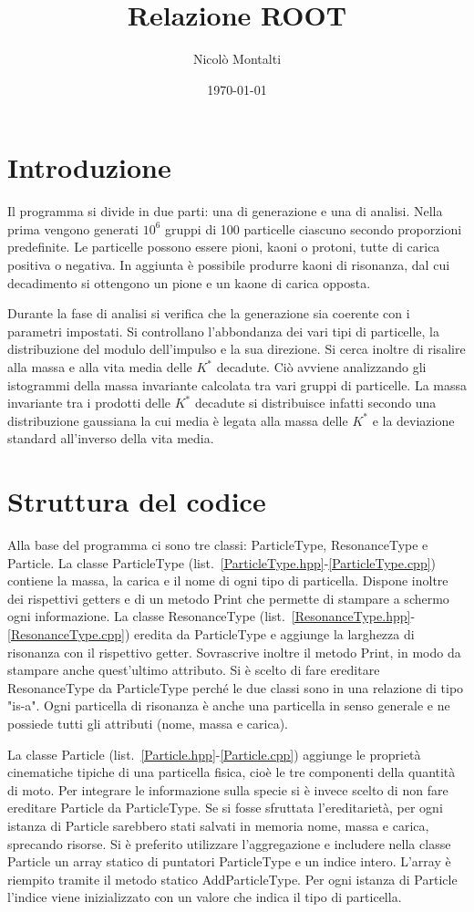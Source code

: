 \documentclass[a4paper,10pt]{article}
\title{Relazione ROOT}
\author{Nicolò Montalti}
\date{\today}
\begin{document}
\maketitle
\section{Introduzione}
Il programma si divide in due parti: una di generazione e una di analisi. Nella prima vengono generati $10^6$ gruppi di 100 particelle ciascuno secondo proporzioni predefinite. Le particelle possono essere pioni, kaoni o protoni, tutte di carica positiva o negativa. In aggiunta è possibile produrre kaoni di risonanza, dal cui decadimento si ottengono un pione e un kaone di carica opposta.

Durante la fase di analisi si verifica che la generazione sia coerente con i parametri impostati. Si controllano l'abbondanza dei vari tipi di particelle, la distribuzione del modulo dell'impulso e la sua direzione. Si cerca inoltre di risalire alla massa e alla vita media delle $K^*$ decadute. Ciò avviene analizzando gli istogrammi della massa invariante calcolata tra vari gruppi di particelle. La massa invariante tra i prodotti delle $K^*$ decadute si distribuisce infatti secondo una distribuzione gaussiana la cui media è legata alla massa delle $K^*$ e la deviazione standard all'inverso della vita media.

\section{Struttura del codice}
Alla base del programma ci sono tre classi: ParticleType, ResonanceType e Particle. La classe ParticleType (list.~\ref{ParticleType.hpp}-\ref{ParticleType.cpp}) contiene la massa, la carica e il nome di ogni tipo di particella. Dispone inoltre dei rispettivi getters e di un metodo Print che permette di stampare a schermo ogni informazione. La classe ResonanceType (list.~\ref{ResonanceType.hpp}-\ref{ResonanceType.cpp}) eredita da ParticleType e aggiunge la larghezza di risonanza con il rispettivo getter. Sovrascrive inoltre il metodo Print, in modo da stampare anche quest'ultimo attributo. Si è scelto di fare ereditare ResonanceType da ParticleType perché le due classi sono in una relazione di tipo "is-a". Ogni particella di risonanza è anche una particella in senso generale e ne possiede tutti gli attributi (nome, massa e carica).

La classe Particle (list.~\ref{Particle.hpp}-\ref{Particle.cpp}) aggiunge le proprietà cinematiche tipiche di una particella fisica, cioè le tre componenti della quantità di moto. Per integrare le informazione sulla specie si è invece scelto di non fare ereditare Particle da ParticleType. Se si fosse sfruttata l'ereditarietà, per ogni istanza di Particle sarebbero stati salvati in memoria nome, massa e carica, sprecando risorse. Si è preferito utilizzare l'aggregazione e includere nella classe Particle un array statico di puntatori ParticleType e un indice intero. L'array è riempito tramite il metodo statico AddParticleType. Per ogni istanza di Particle l'indice viene inizializzato con un valore che indica il tipo di particella.
\end{document}
